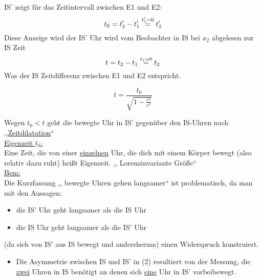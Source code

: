 \documentclass[titlepage,12pt,a4paper,ngerman]{report}
\newcommand{\frbox}[2]{\begin{tcolorbox}[colback=white,colframe=red!75!black,fonttitle=\bfseries,title=#1]#2\end{tcolorbox}} %
\begin{document}
IS' zeigt für das Zeitintervall zwischen E1 und E2:
$$ t_0 = t_2' - t_1' \buildrel t_1' = 0 \over = t_2' $$
Diese Anzeige wird der IS' Uhr wird vom Beobachter in IS bei $ x_2 $ abgelesen zur IS Zeit
$$ t = t_2 - t_1 \buildrel t_1 = 0 \over = t_2 $$
Was der IS Zeitdifferenz zwischen E1 und E2 entspricht.
\frbox{Zeitdilatation}{
\begin{equation*}
t = \frac{t_0}{\sqrt{1-\frac{v^2}{c^2}}} \tag{2}
\end{equation*}}
Wegen $ t_0 < t $ geht die bewegte Uhr in IS' gegenüber den IS-Uhren nach ,,\underline{Zeitdilatation}``\\[5pt]
\underline{Eigenzeit $ t_0 $:}\\
Eine Zeit, die von einer \underline{einzelnen} Uhr, die dich mit einem Körper bewegt (also relativ dazu ruht) heißt Eigenzeit. ,, Lorenzinvariante Größe``\\[5pt]
\underline{Bem:}\\
Die Kurzfassung ,, bewegte Uhren gehen langsamer`` ist problematisch, da man mit den Aussagen:
\begin{itemize}
	\item die IS' Uhr geht langsamer als die IS Uhr
	\item die IS Uhr geht langsamer als die IS' Uhr
\end{itemize}
(da sich von IS' aus IS bewegt und andersherum) einen Widerspruch konstruiert.
\begin{itemize}
	\item Die Asymmetrie zwischen IS und IS' in (2) resultiert von der Messung, die \underline{zwei} Uhren in IS benötigt an denen sich \underline{eine} Uhr in IS' vorbeibewegt.
\end{itemize} 
\end{document}
